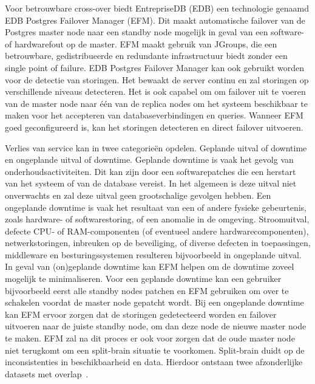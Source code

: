 Voor betrouwbare cross-over biedt EntrepriseDB (EDB) een technologie genaamd EDB Postgres Failover Manager (EFM). Dit maakt automatische failover van de Postgres master node naar een standby node mogelijk in geval van een software- of hardwarefout op de master. EFM maakt gebruik van JGroups, die een betrouwbare, gedistribueerde en redundante infrastructuur biedt zonder een single point of failure.
EDB Postgres Failover Manager kan ook gebruikt worden voor de detectie van storingen. Het bewaakt de server continu en zal storingen op verschillende niveaus detecteren. Het is ook capabel om om failover uit te voeren van de master node naar één van de replica nodes om het systeem beschikbaar te maken voor het accepteren van databaseverbindingen en queries. Wanneer EFM goed geconfigureerd is, kan het storingen detecteren en direct failover uitvoeren.

Verlies van service kan in twee categorieën opdelen. Geplande uitval of downtime en ongeplande uitval of downtime.
Geplande downtime is vaak het gevolg van onderhoudsactiviteiten. Dit kan zijn door een softwarepatches die een herstart van het systeem of van de database vereist. In het algemeen is deze uitval niet onverwachts en zal deze uitval geen grootschalige gevolgen hebben.
Een ongeplande downtime is vaak het resultaat van een of andere fysieke gebeurtenis, zoals hardware- of softwarestoring, of een anomalie in de omgeving. Stroomuitval, defecte CPU- of RAM-componenten (of eventueel andere hardwarecomponenten), netwerkstoringen, inbreuken op de beveiliging, of diverse defecten in toepassingen, middleware en besturingssystemen resulteren bijvoorbeeld in ongeplande uitval.
In geval van (on)geplande downtime kan EFM helpen om de downtime zoveel mogelijk te minimaliseren. Voor een geplande downtime kan een gebruiker bijvoorbeeld eerst alle standby nodes patchen en EFM gebruiken om over te schakelen voordat de master node gepatcht wordt. Bij een ongeplande downtime kan EFM ervoor zorgen dat de storingen gedetecteerd worden en failover uitvoeren naar de juiste standby node, om dan deze node de nieuwe master node te maken. EFM zal na dit proces er ook voor zorgen dat de oude master node niet terugkomt om een split-brain situatie te voorkomen. Split-brain duidt op de inconsistenties in beschikbaarheid en data. Hierdoor ontstaan twee afzonderlijke datasets met overlap~\autocite{Kumar2020}. %





